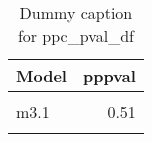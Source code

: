 \begin{table}
\centering
\caption{Dummy caption for ppc_pval_df}
\centering
\fontsize{10}{12}\selectfont
\begin{tabular}[t]{lr}
\toprule
Model & pppval\\
\midrule
\cellcolor{gray!10}{m2} & \cellcolor{gray!10}{0.52}\\
m3.1 & 0.51\\
\cellcolor{gray!10}{m4} & \cellcolor{gray!10}{0.48}\\
\bottomrule
\end{tabular}
\end{table}
